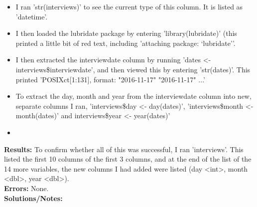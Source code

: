 \documentclass{article}
\begin{document}
\begin{FlushLeft}
\begin{itemize}
    \item I ran 'str(interviews)' to see the current type of this column. It is listed as 'datetime'.
    \item I then loaded the lubridate package by entering 'library(lubridate)' (this printed a little bit of red text, including 'attaching package: ‘lubridate’'.
    \item I then extracted the interview\textunderscore date column by running 'dates \textless - interviews\$interview\textunderscore date', and then viewed this by entering 'str(dates)'. This printed  'POSIXct[1:131], format: "2016-11-17" "2016-11-17" ...'
    \item To extract the day, month and year from the interview\textunderscore date column into new, separate columns I ran, 'interviews\$day <- day(dates)', 'interviews\$month <- month(dates)' and 
    interviews\$year <- year(dates)'
    \item 
\end{itemize}
\textbf{Results:} To confirm whether all of this was successful, I ran 'interviews'. This listed the first 10 columns of the first 3 columns, and at the end of the list of the 14 more variables, the new columns I had added were listed (day <int>, month <dbl>, year <dbl>).\\
\textbf{Errors:} None.\\
\textbf{Solutions/Notes:}\\


\end{FlushLeft}
\end{document}
